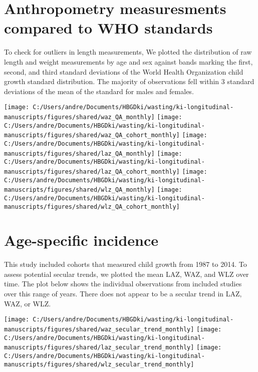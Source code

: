 \documentclass[
  9pt,
]{book}
\begin{document}
\raggedright

\hypertarget{anthropometry-measuresments-compared-to-who-standards}{%
\section{Anthropometry measuresments compared to WHO standards}\label{anthropometry-measuresments-compared-to-who-standards}}

To check for outliers in length measurements, We plotted the distribution of raw length and weight measurements by age and sex against bands marking the first, second, and third standard deviations of the World Health Organization child growth standard distribution. The majority of observations fell within 3 standard deviations of the mean of the standard for males and females.

\texttt{[image: C:/Users/andre/Documents/HBGDki/wasting/ki-longitudinal-manuscripts/figures/shared/waz\_QA\_monthly]}
\texttt{[image: C:/Users/andre/Documents/HBGDki/wasting/ki-longitudinal-manuscripts/figures/shared/waz\_QA\_cohort\_monthly]}
\texttt{[image: C:/Users/andre/Documents/HBGDki/wasting/ki-longitudinal-manuscripts/figures/shared/laz\_QA\_monthly]}
\texttt{[image: C:/Users/andre/Documents/HBGDki/wasting/ki-longitudinal-manuscripts/figures/shared/laz\_QA\_cohort\_monthly]}
\texttt{[image: C:/Users/andre/Documents/HBGDki/wasting/ki-longitudinal-manuscripts/figures/shared/wlz\_QA\_monthly]}
\texttt{[image: C:/Users/andre/Documents/HBGDki/wasting/ki-longitudinal-manuscripts/figures/shared/wlz\_QA\_cohort\_monthly]}

\hypertarget{age-specific-incidence-2}{%
\section{Age-specific incidence}\label{age-specific-incidence-2}}

This study included cohorts that measured child growth from 1987 to 2014. To assess potential secular trends, we plotted the mean LAZ, WAZ, and WLZ over time. The plot below shows the individual observations from included studies over this range of years. There does not appear to be a secular trend in LAZ, WAZ, or WLZ.

\texttt{[image: C:/Users/andre/Documents/HBGDki/wasting/ki-longitudinal-manuscripts/figures/shared/waz\_secular\_trend\_monthly]}
\texttt{[image: C:/Users/andre/Documents/HBGDki/wasting/ki-longitudinal-manuscripts/figures/shared/laz\_secular\_trend\_monthly]}
\texttt{[image: C:/Users/andre/Documents/HBGDki/wasting/ki-longitudinal-manuscripts/figures/shared/wlz\_secular\_trend\_monthly]}

  
\end{document}
